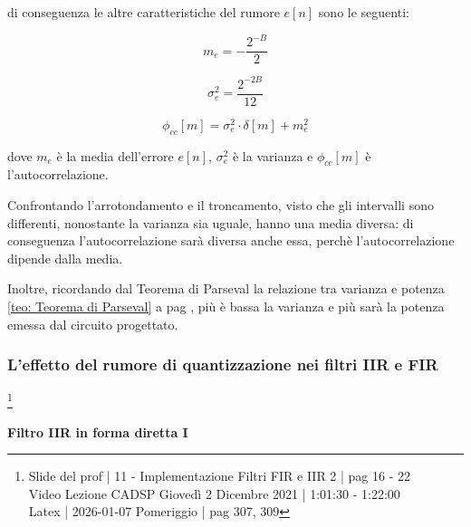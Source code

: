di conseguenza le altre caratteristiche del rumore $e \left[ n\right]$ sono le seguenti: 

{
    \Large 
    \begin{equation}
        m_e 
        =
         - \dfrac{2^{-B}}{2}
    \end{equation}
} 

{
    \Large 
    \begin{equation}
        \sigma_{e}^{2} 
        = 
        \dfrac{2^{-2B}}{12}
    \end{equation}
}

{
    \Large 
    \begin{equation}
        \phi_{cc} \left[ m\right]
        = 
        \sigma_{e}^{2} \cdot \delta \left[ m\right] 
        +
        m_{e}^{2} 
    \end{equation}
}

dove $m_e$ è la media dell'errore $e \left[ n\right]$, $\sigma_{e}^{2}$ è la varianza e $\phi_{cc} \left[ m\right]$ è l'autocorrelazione. \newline 

Confrontando l'arrotondamento e il troncamento, visto che gli intervalli sono differenti, nonostante la varianza sia uguale, 
hanno una media diversa: di conseguenza l'autocorrelazione sarà diversa anche essa, perchè l'autocorrelazione dipende dalla media. \newline 

Inoltre, ricordando dal Teorema di Parseval la relazione tra varianza e potenza  \ref{teo: Teorema di Parseval}  a pag \pageref{teo: Teorema di Parseval}, 
più è bassa la varianza e più sarà la potenza emessa dal circuito progettato. \newline 

\newpage 

\subsubsection{L'effetto del rumore di quantizzazione nei filtri IIR e FIR}

\footnote{ 
    Slide del prof | 11 - Implementazione Filtri FIR e IIR 2 | pag 16 - 22\\
    Video Lezione CADSP Giovedì 2 Dicembre 2021 | 1:01:30 - 1:22:00 \\ 
    Latex | 2026-01-07 Pomeriggio | pag 307, 309       
} 

\textbf{Filtro IIR in forma diretta I }\newline 

